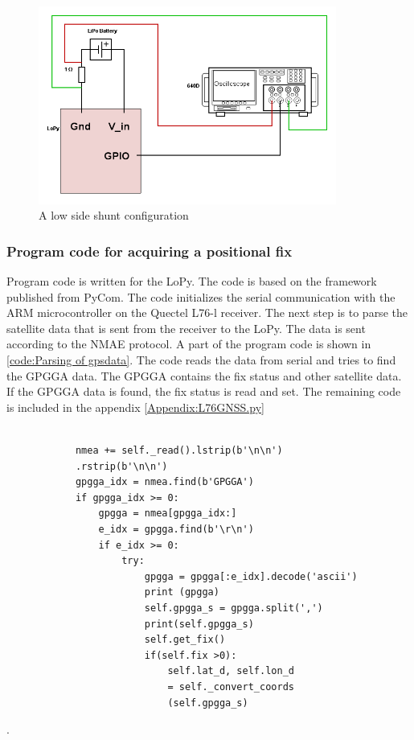 \begin{figure}[H]
\centering
\includegraphics[height=6.5cm]{Project_Report/Images/LoPy_Schematic.png}
\caption{A low side shunt configuration}
\label{fig:LoPy_Schematic}
\end{figure}


\subsubsection{Program code for acquiring a positional fix}
Program code is written for the LoPy. The code is based on the framework published from PyCom. The code initializes the serial communication with the ARM microcontroller on the Quectel L76-l receiver. The next step is to parse the satellite data that is sent from the receiver to the LoPy. The data is sent according to the NMAE protocol. A part of the program code is shown in \ref{code:Parsing of gpsdata}. The code reads the data from serial and tries to find the GPGGA data. The GPGGA contains the fix status and other satellite data. If the GPGGA data is found, the fix status is read and set. The remaining code is included in the appendix \ref{Appendix:L76GNSS.py}

\lstset{language=Python}          %

\begin{lstlisting}[frame=single]  % Start your code-block

            nmea += self._read().lstrip(b'\n\n')
            .rstrip(b'\n\n')
            gpgga_idx = nmea.find(b'GPGGA')
            if gpgga_idx >= 0:
                gpgga = nmea[gpgga_idx:]
                e_idx = gpgga.find(b'\r\n')
                if e_idx >= 0:
                    try:
                        gpgga = gpgga[:e_idx].decode('ascii')
                        print (gpgga)
                        self.gpgga_s = gpgga.split(',')
                        print(self.gpgga_s)
                        self.get_fix()
                        if(self.fix >0):
                            self.lat_d, self.lon_d
                            = self._convert_coords
                            (self.gpgga_s)
\end{lstlisting}
\label{code:Parsing of gpsdata}









.
\newpage